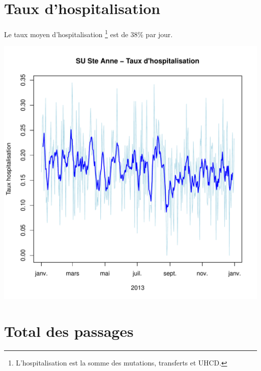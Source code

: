 \documentclass[12pt,english,french,twoside]{book}\usepackage[]{graphicx}\usepackage[]{color}
\makeatletter
\def\maxwidth{ %
  \ifdim\Gin@nat@width>\linewidth
    \linewidth
  \else
    \Gin@nat@width
  \fi
}
\newenvironment{kframe}{%
 \def\at@end@of@kframe{}%
 \ifinner\ifhmode%
  \def\at@end@of@kframe{\end{minipage}}%
  \begin{minipage}{\columnwidth}%
 \fi\fi%
 \def\FrameCommand##1{\hskip\@totalleftmargin \hskip-\fboxsep
 \colorbox{shadecolor}{##1}\hskip-\fboxsep
     \hskip-\linewidth \hskip-\@totalleftmargin \hskip\columnwidth}%
 \MakeFramed {\advance\hsize-\width
   \@totalleftmargin\z@ \linewidth\hsize
   \@setminipage}}%
 {\par\unskip\endMakeFramed%
 \at@end@of@kframe}
\newenvironment{knitrout}{}{} %
\makeatother
\begin{document}
\section{Taux d'hospitalisation}

Le taux moyen d'hospitalisation \footnote{L'hospitalisation est la somme des mutations, transferts et UHCD.} est de 38\% par jour.

\begin{knitrout}
\color{fgcolor}\begin{kframe}


{\ttfamily\noindent\bfseries\color{errorcolor}{\#\# Error: objet de type 'closure' non indiçable}}\end{kframe}
\includegraphics[width=\maxwidth]{figure/hospit_stAnne} 
\begin{kframe}

{\ttfamily\noindent\bfseries{}}\end{kframe}
\end{knitrout}


\section{Total des passages}
\end{document}
